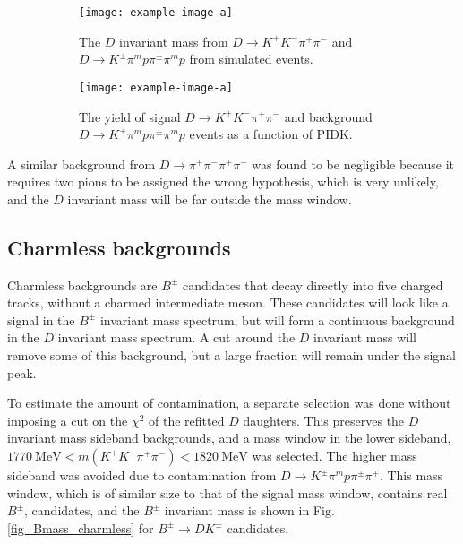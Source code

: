 \documentclass[12pt, a4paper, notitlepage, onecolumn]{article}
\numberwithin{equation}{section}
\begin{document}
\begin{figure}[H] 
  \centering
  \begin{subfigure}{0.5\textwidth}
    \centering
    \texttt{[image: example-image-a]}
    \caption{The $D$ invariant mass from $D\to K^+K^-\pi^+\pi^-$ and $D\to K^\pm\pi^mp\pi^\pm\pi^mp$ from simulated events.}
    \label{fig_Dmass_kpipipi}
  \end{subfigure}%
  \begin{subfigure}{0.5\textwidth}
    \centering
    \texttt{[image: example-image-a]}
    \caption{The yield of signal $D\to K^+K^-\pi^+\pi^-$ and background $D\to K^\pm\pi^mp\pi^\pm\pi^mp$ events as a function of $\text{PIDK}$.}
    \label{fig_yield_kpipipi}
  \end{subfigure}
  \caption{}
\end{figure}

A similar background from $D\to\pi^+\pi^-\pi^+\pi^-$ was found to be negligible because it requires two pions to be assigned the wrong hypothesis, which is very unlikely, and the $D$ invariant mass will be far outside the mass window.

\subsection{Charmless backgrounds}
\label{subsection_charmless}
\noindent Charmless backgrounds are $B^\pm$ candidates that decay directly into five charged tracks, without a charmed intermediate meson. These candidates will look like a signal in the $B^\pm$ invariant mass spectrum, but will form a continuous background in the $D$ invariant mass spectrum. A cut around the $D$ invariant mass will remove some of this background, but a large fraction will remain under the signal peak.

To estimate the amount of contamination, a separate selection was done without imposing a cut on the $\chi^2$ of the refitted $D$ daughters. This preserves the $D$ invariant mass sideband backgrounds, and a mass window in the lower sideband, $\SI{1770}{\mega\eV} < m(K^+K^-\pi^+\pi^-) < \SI{1820}{\mega\eV}$ was selected. The higher mass sideband was avoided due to contamination from $D\to K^\pm\pi^mp\pi^\pm\pi^\mp$. This mass window, which is of similar size to that of the signal mass window, contains real $B^\pm$, candidates, and the $B^\pm$ invariant mass is shown in Fig. \ref{fig_Bmass_charmless} for $B^\pm\to DK^\pm$ candidates.
\end{document}

